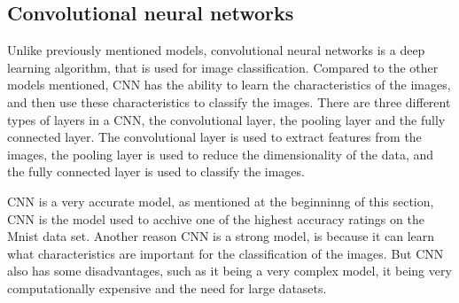 \subsection{Convolutional neural networks}
Unlike previously mentioned models, convolutional neural networks is a deep learning algorithm, that is used for image classification. Compared to the other models mentioned, CNN has the ability to learn the characteristics of the images, and then use these characteristics to classify the images. There are three different types of layers in a CNN, the convolutional layer, the pooling layer and the fully connected layer. The convolutional layer is used to extract features from the images, the pooling layer is used to reduce the dimensionality of the data, and the fully connected layer is used to classify the images.\cite{CNNIBM}

CNN is a very accurate model, as mentioned at the beginninng of this section, CNN is the model used to acchive one of the highest accuracy ratings on the Mnist data set. Another reason CNN is a strong model, is because it can learn what characteristics are important for the classification of the images. But CNN also has some disadvantages, such as it being a very complex model, it being very computationally expensive and the need for large datasets.\cite{CNNProsAndCons}






